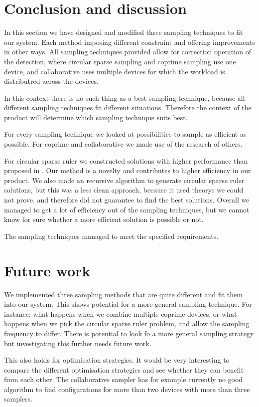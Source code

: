 \documentclass[a4paper, openany, oneside]{memoir}
\begin{document}
\section{Conclusion and discussion}
In this section we have designed and modified three sampling techniques to fit our system. Each method imposing different constraint and offering improvements in other ways. All sampling techniques provided allow for correction operation of the detection, where circular sparse sampling and coprime sampling use one device, and collaborative uses multiple devices for which the workload is distributred across the devices.

In this context there is no such thing as a best sampling technique, because all different sampling techniques fit different situations. Therefore the context of the product will determine which sampling technique suits best.

For every sampling technique we looked at possibilities to sample as efficient as possible. For coprime and collaborative we made use of the research of others. 

For circular sparse ruler we constructed solutions with higher performance than proposed in \cite{ariananda2012compressive}. Our method is a novelty and contributes to higher efficiency in our product. We also made an recursive algorithm to generate circular sparse ruler solutions,  but this was a less clean approach, because it used  theorys we could not prove, and therefore did not guarantee to find the best solutions. Overall we managed to get a lot of efficiency out of the sampling techniques, but we cannot know for sure whether a more efficient solution is possible or not.

The sampling techniques managed to meet the specified requirements. 

\section{Future work}
We implemented three sampling methods that are quite different and fit them into our system. This shows potential for a more general sampling technique. For instance: what happens when we combine multiple coprime devices, or what happens when we pick the circular sparse ruler problem, and allow the sampling frequency to differ. There is potential to look fo a more general sampling strategy but investigating this further needs future work.

This also holds for optimisation strategies. It would be very interesting to compare the different optimisation strategies and see whether they can benefit from each other. The collaborative sampler has for example currently no good algorithm to find configurations for more than two devices with more than three samplers. 
\end{document}
